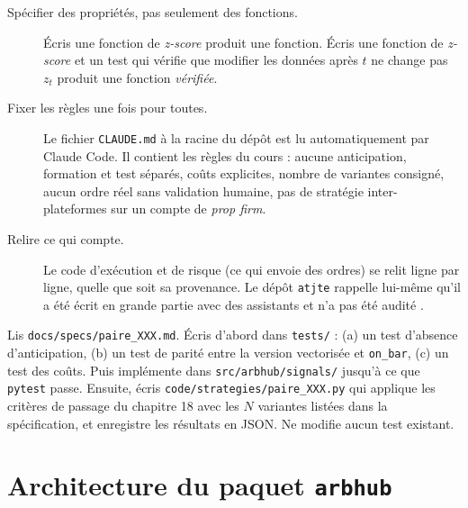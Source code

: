 \begin{description}
\item[Spécifier des propriétés, pas seulement des fonctions.] \og Écris une fonction de \emph{z-score}\fg{} produit une fonction. \og Écris une fonction de \emph{z-score} et un test qui vérifie que modifier les données après $t$ ne change pas $z_t$\fg{} produit une fonction \emph{vérifiée}.
\item[Fixer les règles une fois pour toutes.] Le fichier \texttt{CLAUDE.md} à la racine du dépôt est lu automatiquement par Claude Code. Il contient les règles du cours : aucune anticipation, formation et test séparés, coûts explicites, nombre de variantes consigné, aucun ordre réel sans validation humaine, pas de stratégie inter-plateformes sur un compte de \emph{prop firm}.
\item[Relire ce qui compte.] Le code d'exécution et de risque (ce qui envoie des ordres) se relit ligne par ligne, quelle que soit sa provenance. Le dépôt \texttt{atjte} rappelle lui-même qu'il a été écrit en grande partie avec des assistants et n'a pas été audité \citep{atjte}.
\end{description}

\begin{whiteboard}
\small\og Lis \texttt{docs/specs/paire\_XXX.md}. Écris d'abord dans \texttt{tests/} : (a) un test d'absence d'anticipation, (b) un test de parité entre la version vectorisée et \texttt{on\_bar}, (c) un test des coûts. Puis implémente dans \texttt{src/arbhub/signals/} jusqu'à ce que \texttt{pytest} passe. Ensuite, écris \texttt{code/strategies/paire\_XXX.py} qui applique les critères de passage du chapitre 18 avec les $N$ variantes listées dans la spécification, et enregistre les résultats en JSON. Ne modifie aucun test existant.\fg
\end{whiteboard}

\section{Architecture du paquet \texttt{arbhub}}

